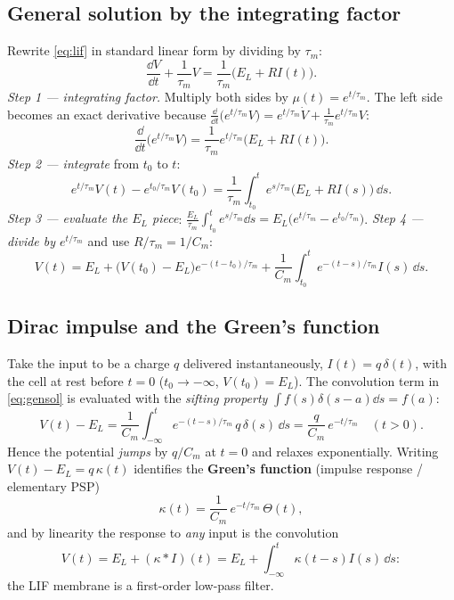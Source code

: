\documentclass[11pt]{article}
\begin{document}
\subsection{General solution by the integrating factor}
Rewrite \eqref{eq:lif} in standard linear form by dividing by $\tau_m$:
\begin{equation}
  \frac{\dd V}{\dd t}+\frac{1}{\tau_m}V=\frac{1}{\tau_m}\big(E_L+RI(t)\big).
\end{equation}
\emph{Step 1 --- integrating factor.} Multiply both sides by $\mu(t)=e^{t/\tau_m}$. The left side
becomes an exact derivative because $\frac{\dd}{\dd t}\!\big(e^{t/\tau_m}V\big)=e^{t/\tau_m}\dot V+
\frac{1}{\tau_m}e^{t/\tau_m}V$:
\begin{equation}
  \frac{\dd}{\dd t}\Big(e^{t/\tau_m}V\Big)=\frac{1}{\tau_m}e^{t/\tau_m}\big(E_L+RI(t)\big).
\end{equation}
\emph{Step 2 --- integrate} from $t_0$ to $t$:
\begin{equation}
  e^{t/\tau_m}V(t)-e^{t_0/\tau_m}V(t_0)
   =\frac{1}{\tau_m}\int_{t_0}^t e^{s/\tau_m}\big(E_L+RI(s)\big)\,\dd s.
\end{equation}
\emph{Step 3 --- evaluate the $E_L$ piece}: $\frac{E_L}{\tau_m}\int_{t_0}^t e^{s/\tau_m}\dd s
=E_L\big(e^{t/\tau_m}-e^{t_0/\tau_m}\big)$. \emph{Step 4 --- divide by $e^{t/\tau_m}$} and use
$R/\tau_m=1/C_m$:
\begin{equation}
  \boxed{\;V(t)=E_L+\big(V(t_0)-E_L\big)e^{-(t-t_0)/\tau_m}
   +\frac{1}{C_m}\int_{t_0}^t e^{-(t-s)/\tau_m}I(s)\,\dd s.\;}
  \label{eq:gensol}
\end{equation}

\subsection{Dirac impulse and the Green's function}
Take the input to be a charge $q$ delivered instantaneously, $I(t)=q\,\delta(t)$, with the cell at
rest before $t=0$ ($t_0\to-\infty$, $V(t_0)=E_L$). The convolution term in \eqref{eq:gensol} is
evaluated with the \emph{sifting property} $\int f(s)\delta(s-a)\dd s=f(a)$:
\begin{equation}
  V(t)-E_L=\frac{1}{C_m}\int_{-\infty}^{t} e^{-(t-s)/\tau_m}\,q\,\delta(s)\,\dd s
   =\frac{q}{C_m}\,e^{-t/\tau_m}\quad(t>0).
\end{equation}
Hence the potential \emph{jumps} by $q/C_m$ at $t=0$ and relaxes exponentially. Writing
$V(t)-E_L=q\,\kappa(t)$ identifies the \textbf{Green's function} (impulse response / elementary PSP)
\begin{equation}
  \kappa(t)=\frac{1}{C_m}\,e^{-t/\tau_m}\,\Theta(t),
  \label{eq:green}
\end{equation}
and by linearity the response to \emph{any} input is the convolution
\begin{equation}
  V(t)=E_L+(\kappa*I)(t)=E_L+\int_{-\infty}^t\kappa(t-s)I(s)\,\dd s :
  \label{eq:conv}
\end{equation}
the LIF membrane is a first-order low-pass filter.
\end{document}
